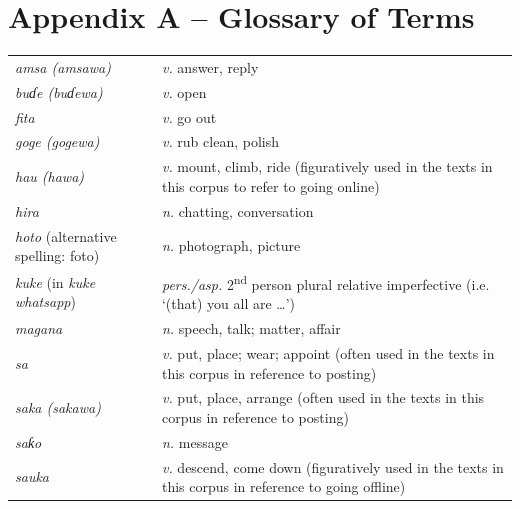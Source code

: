 \documentclass[output=paper,newtxmath,modfonts,nonflat,hidelinks]{langsci/langscibook}
\begin{document}
\section*{Appendix A – Glossary of  Terms}
\noindent
\begin{tabularx}{\textwidth}{lQ}
\textit{amsa (amsawa)} & \textit{v.} answer, reply \\
\textit{buɗe (buɗewa)} & \textit{v.} open \\
\textit{fita} & \textit{v.} go out\\
\textit{goge (gogewa)} & \textit{v.} rub clean, polish\\
\textit{hau (hawa)} & \textit{v.} mount, climb, ride (figuratively used in the texts in this corpus to refer to going online) \\
\textit{hira} & \textit{n.} chatting, conversation\\
\textit{hoto} (alternative spelling: foto) & \textit{n.} photograph, picture\\
\textit{kuke} (in \textit{kuke whatsapp}) & \textit{pers./asp.} 2\textsuperscript{nd} person plural relative imperfective (i.e. ‘(that) you all are …’)\\
\textit{magana} & \textit{n.} speech, talk; matter, affair\\
\textit{sa} & \textit{v.} put, place; wear; appoint (often used in the texts in this corpus in reference to posting)\\
\textit{saka (sakawa)} & \textit{v.} put, place, arrange (often used in the texts in this corpus in reference to posting)\\
\textit{saƙo} & \textit{n.} message\\
\textit{sauka} & \textit{v.} descend, come down (figuratively used in the texts in this corpus in reference to going offline)\\
\end{tabularx}
\end{document}

